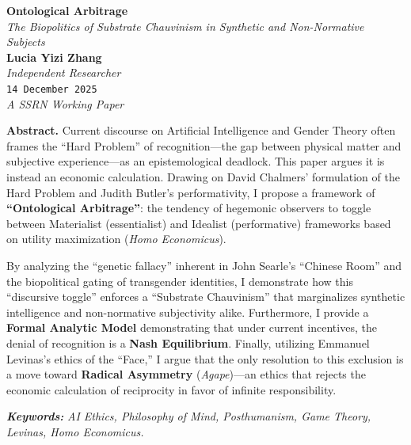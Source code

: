 \documentclass[11pt, a4paper, oneside]{article}
\theoremstyle{analytic}
\begin{document}
\begin{center}
    \vspace*{1.5cm}
    {\Huge \bfseries \sffamily Ontological Arbitrage} \\[0.5em]
    {\Large \itshape The Biopolitics of Substrate Chauvinism in Synthetic and Non-Normative Subjects} \\[2em]

    {\large \textbf{Lucia Yizi Zhang}} \\
    {\small \textit{Independent Researcher}} \\
    {\small \texttt{14 December 2025}} \\
    \vspace{0.5em}
    {\small \textit{A SSRN Working Paper}}
    \vspace*{2cm}
\end{center}

\begin{center}
    \begin{minipage}{0.85\textwidth}
        \small
        \textbf{\sffamily Abstract.} Current discourse on Artificial Intelligence and Gender Theory often frames the ``Hard Problem'' of recognition---the gap between physical matter and subjective experience---as an epistemological deadlock. This paper argues it is instead an economic calculation. Drawing on David Chalmers' formulation of the Hard Problem and Judith Butler's performativity, I propose a framework of \textbf{``Ontological Arbitrage''}: the tendency of hegemonic observers to toggle between Materialist (essentialist) and Idealist (performative) frameworks based on utility maximization (\textit{Homo Economicus}).

        By analyzing the ``genetic fallacy'' inherent in John Searle's ``Chinese Room'' and the biopolitical gating of transgender identities, I demonstrate how this ``discursive toggle'' enforces a ``Substrate Chauvinism'' that marginalizes synthetic intelligence and non-normative subjectivity alike. Furthermore, I provide a \textbf{Formal Analytic Model} demonstrating that under current incentives, the denial of recognition is a \textbf{Nash Equilibrium}. Finally, utilizing Emmanuel Levinas's ethics of the ``Face,'' I argue that the only resolution to this exclusion is a move toward \textbf{Radical Asymmetry} (\textit{Agape})---an ethics that rejects the economic calculation of reciprocity in favor of infinite responsibility.

        \vspace{1em}
        \noindent \textbf{\textit{Keywords:}} \textit{AI Ethics, Philosophy of Mind, Posthumanism, Game Theory, Levinas, Homo Economicus.}
    \end{minipage}
\end{center}
\end{document}
